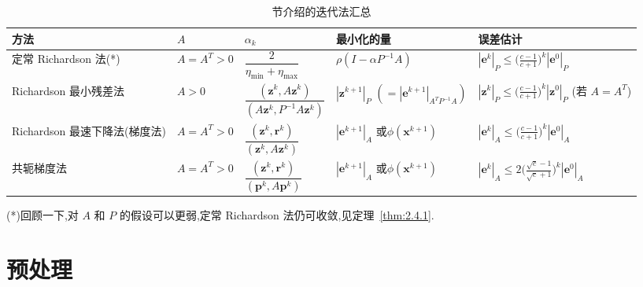 \begin{table}[htbp]
  \centering
  \caption{ 节介绍的迭代法汇总}\label{tab:2.4.1}
  \small
  \setlength{\tabcolsep}{3pt}
  \renewcommand{\arraystretch}{1.9}
  \begin{tabular}{@{}p{.18\linewidth}p{.10\linewidth}p{.17\linewidth}p{.20\linewidth}p{.28\linewidth}@{}}
    \toprule
    方法 & \(A\) & \(\alpha_k\) & 最小化的量 & 误差估计 \\
    \midrule
    定常 Richardson 法(*) &
    \(A=A^T>0\) &
    \(\dfrac{2}{\eta_{\min}+\eta_{\max}}\) &
    \(\rho(I-\alpha P^{-1}A)\) &
    \(|\boldsymbol{e}^k|_P\le\bigl(\frac{c-1}{c+1}\bigr)^k|\boldsymbol{e}^0|_P\) \\
    \addlinespace
    Richardson 最小残差法 &
    \(A>0\) &
    \(\dfrac{(\boldsymbol{z}^k,A\boldsymbol{z}^k)}{(A\boldsymbol{z}^k,P^{-1}A\boldsymbol{z}^k)}\) &
    \(|\boldsymbol{z}^{k+1}|_P\)\newline
    \((=|\boldsymbol{e}^{k+1}|_{A^TP^{-1}A})\) &
    \(|\boldsymbol{z}^k|_P\le\bigl(\frac{c-1}{c+1}\bigr)^k|\boldsymbol{z}^0|_P\)\newline
    (若 \(A=A^T\))\\
    \addlinespace
    Richardson 最速下降法(梯度法) &
    \(A=A^T>0\) &
    \(\dfrac{(\boldsymbol{z}^k,\boldsymbol{r}^k)}{(\boldsymbol{z}^k,A\boldsymbol{z}^k)}\) &
    \(|\boldsymbol{e}^{k+1}|_A\) 或\newline\(\phi(\boldsymbol{x}^{k+1})\) &
    \(|\boldsymbol{e}^k|_A\le\bigl(\frac{c-1}{c+1}\bigr)^k|\boldsymbol{e}^0|_A\) \\
    \addlinespace
    共轭梯度法 &
    \(A=A^T>0\) &
    \(\dfrac{(\boldsymbol{z}^k,\boldsymbol{r}^k)}{(\boldsymbol{p}^k,A\boldsymbol{p}^k)}\) &
    \(|\boldsymbol{e}^{k+1}|_A\) 或\newline\(\phi(\boldsymbol{x}^{k+1})\) &
    \(|\boldsymbol{e}^k|_A\le 2\bigl(\frac{\sqrt c-1}{\sqrt c+1}\bigr)^k|\boldsymbol{e}^0|_A\) \\
    \bottomrule
  \end{tabular}\par
  \smallskip
  \raggedright (*)回顾一下,对 \(A\) 和 \(P\) 的假设可以更弱,定常 Richardson 法仍可收敛,见定理~\ref{thm:2.4.1}.
\end{table}

\section{预处理}\label{sec:2.5}

